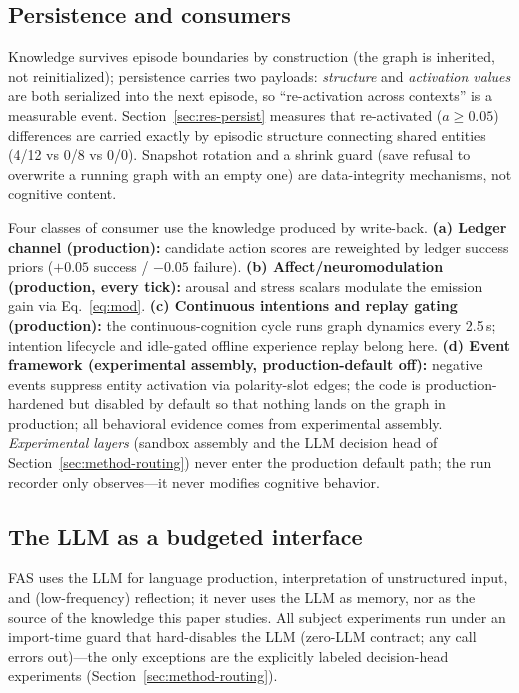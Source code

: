 \documentclass[10pt,a4paper]{article}
\begin{document}
\subsection{Persistence and consumers}
\label{sec:arch-persist}
Knowledge survives episode boundaries by construction (the graph is inherited, not reinitialized); persistence carries two payloads: \emph{structure} and \emph{activation values} are both serialized into the next episode, so ``re-activation across contexts'' is a measurable event. Section~\ref{sec:res-persist} measures that re-activated ($a\ge0.05$) differences are carried exactly by episodic structure connecting shared entities (4/12 vs 0/8 vs 0/0). Snapshot rotation and a shrink guard (save refusal to overwrite a running graph with an empty one) are data-integrity mechanisms, not cognitive content.

Four classes of consumer use the knowledge produced by write-back. \textbf{(a) Ledger channel (production):} candidate action scores are reweighted by ledger success priors ($+0.05$ success / $-0.05$ failure). \textbf{(b) Affect/neuromodulation (production, every tick):} arousal and stress scalars modulate the emission gain via Eq.~\ref{eq:mod}. \textbf{(c) Continuous intentions and replay gating (production):} the continuous-cognition cycle runs graph dynamics every 2.5\,s; intention lifecycle and idle-gated offline experience replay belong here. \textbf{(d) Event framework (experimental assembly, production-default off):} negative events suppress entity activation via polarity-slot edges; the code is production-hardened but disabled by default so that nothing lands on the graph in production; all behavioral evidence comes from experimental assembly. \emph{Experimental layers} (sandbox assembly and the LLM decision head of Section~\ref{sec:method-routing}) never enter the production default path; the run recorder only observes---it never modifies cognitive behavior.

\subsection{The LLM as a budgeted interface}
\label{sec:arch-llm}
FAS uses the LLM for language production, interpretation of unstructured input, and (low-frequency) reflection; it never uses the LLM as memory, nor as the source of the knowledge this paper studies. All subject experiments run under an import-time guard that hard-disables the LLM (zero-LLM contract; any call errors out)---the only exceptions are the explicitly labeled decision-head experiments (Section~\ref{sec:method-routing}).
\end{document}
